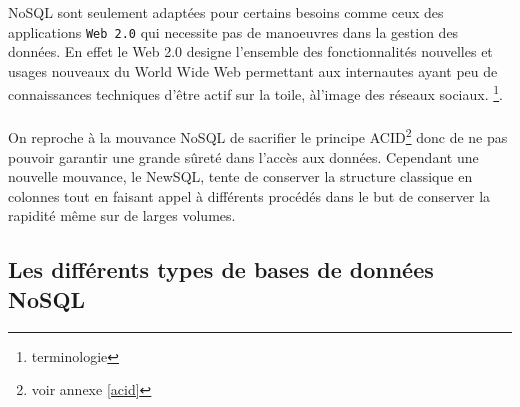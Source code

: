 \textsf{NoSQL} sont seulement adaptées pour certains besoins comme
ceux des applications \texttt{Web 2.0} qui necessite pas de manoeuvres dans la gestion des données. En effet le \textsf{Web 2.0} designe l'ensemble des fonctionnalités nouvelles et usages nouveaux du World Wide Web
permettant aux internautes ayant peu de connaissances techniques d’être actif sur la toile, àl’image des réseaux sociaux.
\footnote{terminologie }.  \\\\ On reproche à la
mouvance \textsf{NoSQL} de sacrifier le principe
\textsf{ACID}\footnote{voir annexe \ref{acid}}  donc de ne
pas pouvoir garantir une grande sûreté dans l'accès aux
données. Cependant une nouvelle mouvance, le \textsf{NewSQL}, tente de
conserver la structure classique en colonnes tout en faisant appel à
différents procédés dans le but de conserver la rapidité même sur de
larges volumes\cite{newSQL}.

\subsection{Les différents types de bases de données \textsf{NoSQL}} 
 

